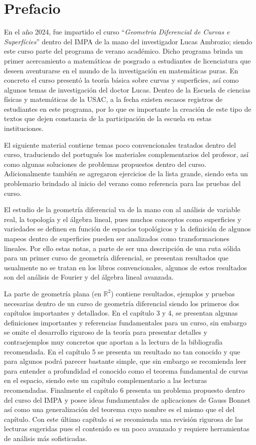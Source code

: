 \documentclass[oneside,11pt]{memoir}
\begin{document}
\chapter*{Prefacio}
En el año 2024, fue impartido el curso ``\textit{Geometria Diferencial de Curvas e Superfícies}'' dentro del IMPA de la mano del investigador Lucas Ambrozio; siendo este curso parte del programa de verano académico. Dicho programa brinda un primer acercamiento a matemáticas de posgrado a estudiantes de licenciatura que deseen aventurarse en el mundo de la investigación en matemáticas puras. En concreto el curso presentó la teoría básica sobre curvas y superficies, así como algunos temas de investigación del doctor Lucas. Dentro de la Escuela de ciencias físicas y matemáticas de la USAC, a la fecha existen escasos registros de estudiantes en este programa, por lo que es importante la creación de este tipo de textos que dejen constancia de la participación de la escuela en estas instituciones.

El siguiente material contiene temas poco convencionales tratados dentro del curso, traduciendo del portugués los materiales complementarios del profesor, así como algunas soluciones de problemas propuestos dentro del curso. Adicionalmente también se agregaron ejercicios de la lista grande, siendo esta un problemario brindado al inicio del verano como referencia para las pruebas del curso.

El estudio de la geometría diferencial va de la mano con al análisis de variable real, la topología y el álgebra lineal, pues muchos conceptos como superficies y variedades se definen en función de espacios topológicos y la definición de algunos mapeos dentro de superficies pueden ser analizados como transformaciones lineales. Por ello estas notas, a parte de ser una descripción de una ruta sólida para un primer curso de geometría diferencial, se presentan resultados que usualmente no se tratan en los libros convencionales, algunos de estos resultados son del análisis de Fourier y del álgebra lineal avanzada.


La parte de geometría plana (en $\mathbb{R}^2$) contiene resultados, ejemplos y pruebas necesarias dentro de un curso de geometría diferencial siendo los primeros dos capítulos importantes y detallados. En el capítulo 3 y 4, se presentan algunas definiciones importantes y referencias fundamentales para un curso, sin embargo se omite el desarrollo riguroso de la teoría para presentar detalles y contraejemplos muy concretos que aportan a la lectura de la bibliografía recomendada. En el capítulo 5 se presenta un resultado no tan conocido y que para algunos podrá parecer bastante simple, que sin embargo se recomienda leer para entender a profundidad el conocido como el teorema fundamental de curvas en el espacio, siendo este un capítulo complementario a las lecturas recomendadas. Finalmente el capítulo 6 presenta un problema propuesto dentro del curso del IMPA y posee ideas fundamentales de aplicaciones de Gauss Bonnet así como una generalización del teorema cuyo nombre es el mismo que el del capítulo. Con este último capítulo si se recomienda una revisión rigurosa de las lecturas sugeridas pues el contenido es un poco avanzado y requiere herramientas de análisis más sofisticadas.
\end{document}
